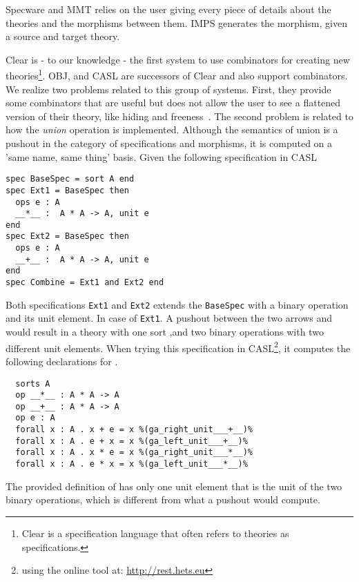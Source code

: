 
Specware and MMT relies on the user giving every piece of details about the theories and the morphisms between them. IMPS generates the morphism, given a source and target theory. 

Clear is - to our knowledge - the first system to use combinators for creating new theories\footnote{Clear is a specification language that often refers to theories as specifications.}. OBJ, and CASL are successors of Clear and also support combinators. We realize two problems related to this group of systems. First, they provide some combinators that are useful but does not allow the user to see a flattened version of their theory, like hiding and freeness~\cite{CoFI:2004:CASL-RM}. The second problem is related to how the \emph{union} operation is implemented. Although the semantics of union is a pushout in the category of specifications and morphisms, it is computed on a 'same name, same thing' basis. Given the following specification in CASL 
\begin{lstlisting}
spec BaseSpec = sort A end 
spec Ext1 = BaseSpec then 
  ops e : A 
  __*__ :  A * A -> A, unit e 
end 
spec Ext2 = BaseSpec then 
  ops e : A 
  __+__ :  A * A -> A, unit e 
end 
spec Combine = Ext1 and Ext2 end
\end{lstlisting}
Both specifications \verb|Ext1| and \verb|Ext2| extends the \verb|BaseSpec| with a binary operation and its unit element. In case of \verb|Ext1|. A pushout between the two arrows  and  would result in a theory with one sort ,and  two binary operations with two different unit elements. When trying this specification in CASL\footnote{using the online tool at: \url{http://rest.hets.eu}}, it computes the following declarations for .  
\begin{lstlisting}
  sorts A
  op __*__ : A * A -> A
  op __+__ : A * A -> A
  op e : A
  forall x : A . x + e = x %(ga_right_unit___+__)%
  forall x : A . e + x = x %(ga_left_unit___+__)%
  forall x : A . x * e = x %(ga_right_unit___*__)%
  forall x : A . e * x = x %(ga_left_unit___*__)%
\end{lstlisting} 
The provided definition of  has only one unit element that is the unit of the two binary operations, which is different from what a pushout would compute. 

